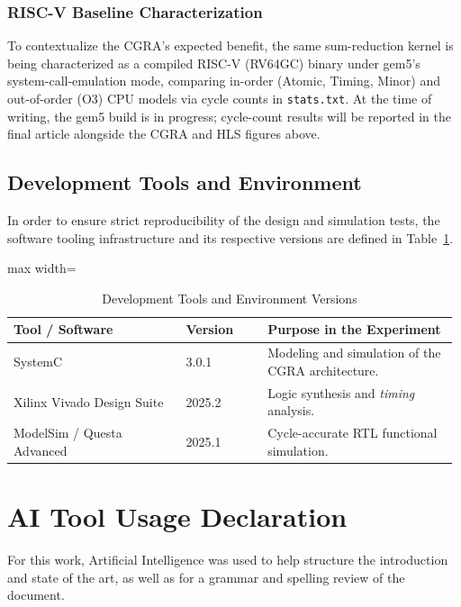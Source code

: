 \documentclass[conference]{IEEEtran}
\begin{document}
\subsubsection{RISC-V Baseline Characterization}
To contextualize the CGRA's expected benefit, the same sum-reduction kernel is being characterized as a compiled RISC-V (RV64GC) binary under gem5's system-call-emulation mode, comparing in-order (Atomic, Timing, Minor) and out-of-order (O3) CPU models via cycle counts in \texttt{stats.txt}. At the time of writing, the gem5 build is in progress; cycle-count results will be reported in the final article alongside the CGRA and HLS figures above.

\subsection{Development Tools and Environment}
In order to ensure strict reproducibility of the design and simulation tests, the software tooling infrastructure and its respective versions are defined in Table~\ref{tab:herramientas}.

\begin{table}[htbp]
\caption{Development Tools and Environment Versions}
\label{tab:herramientas}
\centering
\scriptsize
\begin{adjustbox}{max width=\columnwidth}
\begin{tabular}{@{}p{0.38\linewidth}p{0.18\linewidth}p{0.42\linewidth}@{}}
\toprule
\textbf{Tool / Software} & \textbf{Version} & \textbf{Purpose in the Experiment} \\
\midrule
SystemC & 3.0.1 & Modeling and simulation of the CGRA architecture. \\
Xilinx Vivado Design Suite & 2025.2 & Logic synthesis and \textit{timing} analysis. \\
ModelSim / Questa Advanced & 2025.1 & Cycle-accurate RTL functional simulation. \\
\bottomrule
\end{tabular}
\end{adjustbox}
\end{table}

\section*{AI Tool Usage Declaration}
For this work, Artificial Intelligence was used to help structure the introduction and state of the art, as well as for a grammar and spelling review of the document.




\end{document}
